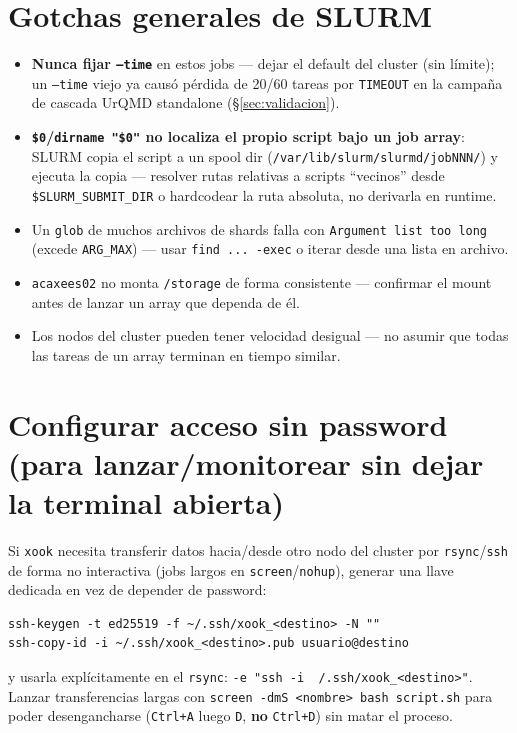 \documentclass[11pt]{article}
\begin{document}
\section{Gotchas generales de SLURM}

\begin{itemize}[leftmargin=*]
  \item \textbf{Nunca fijar \texttt{--time}} en estos jobs --- dejar el
  default del cluster (sin límite); un \texttt{--time} viejo ya causó
  pérdida de 20/60 tareas por \texttt{TIMEOUT} en la campaña de cascada
  UrQMD standalone (\S\ref{sec:validacion}).
  \item \textbf{\texttt{\$0}/\texttt{dirname "\$0"} no localiza el propio
  script bajo un job array}: SLURM copia el script a un spool dir
  (\texttt{/var/lib/slurm/slurmd/jobNNN/}) y ejecuta la copia --- resolver
  rutas relativas a scripts ``vecinos'' desde \texttt{\$SLURM\_SUBMIT\_DIR}
  o hardcodear la ruta absoluta, no derivarla en runtime.
  \item Un \texttt{glob} de muchos archivos de shards falla con
  \texttt{Argument list too long} (excede \texttt{ARG\_MAX}) --- usar
  \texttt{find ... -exec} o iterar desde una lista en archivo.
  \item \texttt{acaxees02} no monta \texttt{/storage} de forma consistente
  --- confirmar el mount antes de lanzar un array que dependa de él.
  \item Los nodos del cluster pueden tener velocidad desigual --- no asumir
  que todas las tareas de un array terminan en tiempo similar.
\end{itemize}

\section{Configurar acceso sin password (para lanzar/monitorear sin dejar
la terminal abierta)}

Si \texttt{xook} necesita transferir datos hacia/desde otro nodo del
cluster por \texttt{rsync}/\texttt{ssh} de forma no interactiva (jobs largos
en \texttt{screen}/\texttt{nohup}), generar una llave dedicada en vez de
depender de password:

\begin{Verbatim}[fontsize=\small]
ssh-keygen -t ed25519 -f ~/.ssh/xook_<destino> -N ""
ssh-copy-id -i ~/.ssh/xook_<destino>.pub usuario@destino
\end{Verbatim}

y usarla explícitamente en el \texttt{rsync}: \texttt{-e "ssh -i
~/.ssh/xook\_<destino>"}. Lanzar transferencias largas con
\texttt{screen -dmS <nombre> bash script.sh} para poder desengancharse
(\texttt{Ctrl+A} luego \texttt{D}, \textbf{no} \texttt{Ctrl+D}) sin matar el
proceso.
\end{document}
